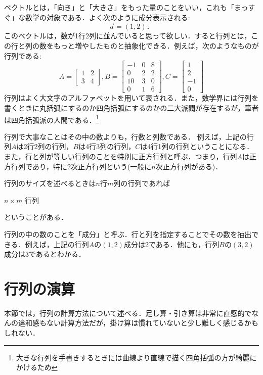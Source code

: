 \documentclass[a4paper,12pt,autodetect-engine,dvipdfmx]{jsarticle}
\theoremstyle{definition}
\begin{document}
ベクトルとは，「向き」と「大きさ」をもった量のことをいい，これも「まっすぐ」な数学の対象である．よく次のように成分表示される:
\begin{equation*}
    \vec{a} = (1,2)．
\end{equation*}
このベクトルは，数が1行2列に並んでいると思って欲しい．すると行列とは，この行と列の数をもっと増やしたものと抽象化できる．例えば，次のようなものが行列である:
\begin{equation*}
    A=\begin{bmatrix}
        1 & 2\\
        3 & 4
    \end{bmatrix},
    B=\begin{bmatrix}
        -1 & 0 & 8\\
        0 & 2 & 2 \\
        10 & 3 & 0\\
        0 & 1 & 6
    \end{bmatrix},
    C=\begin{bmatrix}
        1\\
        2\\
        -1\\
        0
    \end{bmatrix}
\end{equation*}
行列はよく大文字のアルファベットを用いて表される．また，数学界には行列を書くときに丸括弧にするのか四角括弧にするのかの二大派閥が存在するが，筆者は四角括弧派の人間である．\footnote{大きな行列を手書きするときには曲線より直線で描く四角括弧の方が綺麗にかけるため}

行列で大事なことはその中の数よりも，行数と列数である．
例えば，上記の行列$A$は2行2列の行列，$B$は4行3列の行列，$C$は4行1列の行列ということになる．
また，行と列が等しい行列のことを特別に正方行列と呼ぶ．つまり，行列$A$は正方行列であり，特に2次正方行列という(一般に$n$次正方行列がある)．

行列のサイズを述べるときは$n$行$m$列の行列であれば
\begin{center}
    $n \times m$ 行列
\end{center}
ということがある．

行列の中の数のことを「成分」と呼ぶ．行と列を指定することでその数を抽出できる．例えば，上記の行列$A$の$(1,2)$成分は2である．他にも，行列$B$の$(3,2)$成分は3であるとわかる．
\section{行列の演算}
本節では，行列の計算方法について述べる．足し算・引き算は非常に直感的でなんの違和感もない計算方法だが，掛け算は慣れていないと少し難しく感じるかもしれない．
\end{document}

